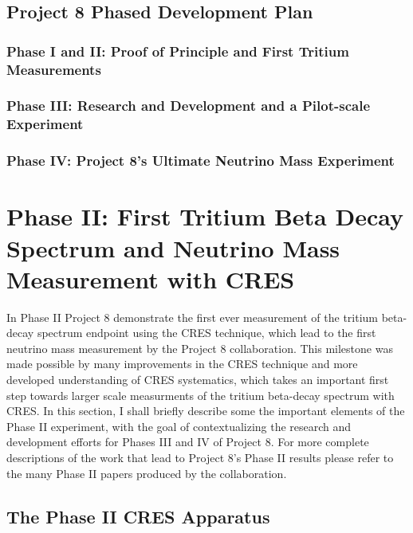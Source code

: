 \subsection{Project 8 Phased Development Plan}

\subsubsection*{Phase I and II: Proof of Principle and First Tritium Measurements}

\subsubsection*{Phase III: Research and Development and a Pilot-scale Experiment}

\subsubsection*{Phase IV: Project 8's Ultimate Neutrino Mass Experiment}

\section{Phase II: First Tritium Beta Decay Spectrum and Neutrino Mass Measurement with CRES}

In Phase II Project 8 demonstrate the first ever measurement of the tritium beta-decay spectrum endpoint using the CRES technique, which lead to the first neutrino mass measurement by the Project 8 collaboration. This milestone was made possible by many improvements in the CRES technique and more developed understanding of CRES systematics, which takes an important first step towards larger scale measurments of the tritium beta-decay spectrum with CRES. In this section, I shall briefly describe some the important elements of the Phase II experiment, with the goal of contextualizing the research and development efforts for Phases III and IV of Project 8. For more complete descriptions of the work that lead to Project 8's Phase II results please refer to the many Phase II papers produced by the collaboration.

\subsection{The Phase II CRES Apparatus}

